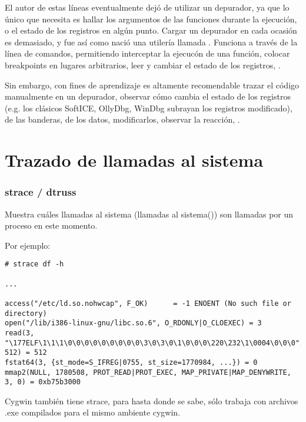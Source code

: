 El autor de estas l\'ineas eventualmente dej\'o de utilizar un depurador, ya que lo \'unico que necesita es hallar los argumentos
de las funciones durante la ejecuci\'on, o el estado de los registros en alg\'un punto.
Cargar un depurador en cada ocasi\'on es demasiado, y fue as\'i como naci\'o una utiler\'ia llamada .
Funciona a trav\'es de la l\'inea de comandos, permitiendo interceptar la ejecuc\'on de una funci\'on,
colocar breakpoints en lugares arbitrarios, leer y cambiar el estado de los registros, \etc{}.

Sin embargo, con fines de aprendizaje es altamente recomendable trazar el c\'odigo manualmente en un depurador,
observar c\'omo cambia el estado de los registros (e.g. los cl\'asicos SoftICE, OllyDbg, WinDbg subrayan los registros modificado),
de las banderas, de los datos, modificarlos, observar la reacci\'on, \etc{}.

\chapter{Trazado de llamadas al sistema}

\label{strace}
\subsection{strace / dtruss}

Muestra cu\'ales llamadas al sistema (llamadas al sistema()) son llamadas por un proceso en este momento.

Por ejemplo:

\begin{lstlisting}
# strace df -h

...

access("/etc/ld.so.nohwcap", F_OK)      = -1 ENOENT (No such file or directory)
open("/lib/i386-linux-gnu/libc.so.6", O_RDONLY|O_CLOEXEC) = 3
read(3, "\177ELF\1\1\1\0\0\0\0\0\0\0\0\0\3\0\3\0\1\0\0\0\220\232\1\0004\0\0\0"..., 512) = 512
fstat64(3, {st_mode=S_IFREG|0755, st_size=1770984, ...}) = 0
mmap2(NULL, 1780508, PROT_READ|PROT_EXEC, MAP_PRIVATE|MAP_DENYWRITE, 3, 0) = 0xb75b3000
\end{lstlisting}

\myindex{\MacOSX}
%
%
%
\PTBRph{}%
\DEph{}\PLph{}%
\ITAph{}

Cygwin tambi\'en tiene strace, para hasta donde se sabe, s\'olo trabaja con archivos .exe
compilados para el mismo ambiente cygwin.

